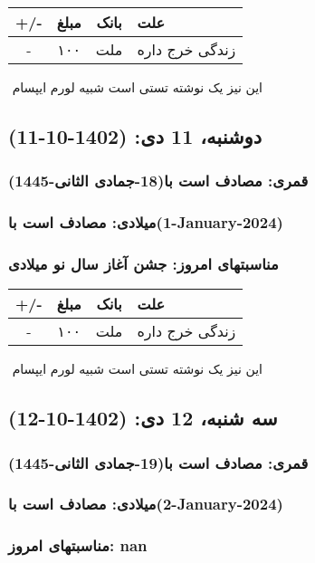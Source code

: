 \documentclass{article}
\newcommand{\rnote}[1]{\marginpar{\textcolor{color}{\StrSubstitute{\##1}{ }{\_}}}}
\newcommand{\myRow}[4]{
    #1 & #2 & #3 & #4 \\ \hline
}
\begin{document}
\begin{tabular}{ | c | c | c | p{5cm} |}
    \hline
    \myRow{ +/- }{مبلغ}{بانک}{علت}
    \myRow{-}{۱۰۰}{ملت}{زندگی خرج داره}
\end{tabular}
\newline
\newline

‌
\rnote{تست}
این نیز یک نوشته تستی است شبیه لورم ایپسام




\newpage
{}
\textcolor{color}{
\section{ دوشنبه، 11 دی: (1402-10-11) }
\subsubsection*{قمری: مصادف است با(18-جمادی الثانی-1445)} 
\subsubsection*{میلادی: مصادف است با(1-January-2024)}
\subsubsection*{مناسبتهای امروز: جشن آغاز سال نو میلادی}
}


\begin{tabular}{ | c | c | c | p{5cm} |}
    \hline
    \myRow{ +/- }{مبلغ}{بانک}{علت}
    \myRow{-}{۱۰۰}{ملت}{زندگی خرج داره}
\end{tabular}
\newline
\newline

‌
\rnote{تست}
این نیز یک نوشته تستی است شبیه لورم ایپسام




\newpage
{}
\textcolor{color}{
\section{ سه شنبه، 12 دی: (1402-10-12) }
\subsubsection*{قمری: مصادف است با(19-جمادی الثانی-1445)} 
\subsubsection*{میلادی: مصادف است با(2-January-2024)}
\subsubsection*{مناسبتهای امروز: nan}
}
\end{document}

